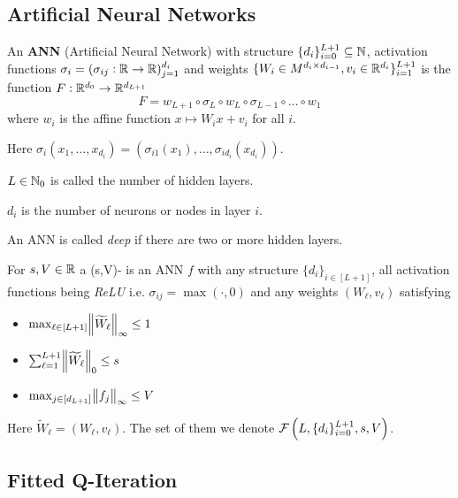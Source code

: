

\subsection{Artificial Neural Networks}

\begin{defn}\label{def_ANN}
	An \textbf{ANN} (Artificial Neural Network) with structure
	$\{ d_i \}_{i=0}^{L+1} \subseteq \mathbb{N}$,
	activation functions $\sigma_i = (\sigma_{ij} : \mathbb{R} \to \mathbb{R})_{j=1}^{d_i}$
	and weights $\{ W_i \in M^{d_i \times d_{i-1}}, v_i \in \mathbb{R}^{d_i} \}_{i=1}^{L+1}$
	is the function $F:\mathbb{R}^{d_0} \to \mathbb{R}^{d_{L+1}}$ 
	\[ F = w_{L+1} \circ \sigma_L \circ w_L \circ \sigma_{L-1} \circ \dots \circ w_1 \]
	where $w_i$ is the affine function $x \mapsto W_i x + v_i$ for all $i$.

	Here $\sigma_i(x_1, \dots, x_{d_i})
	= (\sigma_{i1}(x_1), \dots, \sigma_{id_{i}}(x_{d_{i}}))$.

	$L \in \mathbb{N}_0$ is called the number of hidden layers.

	$d_i$ is the number of neurons or nodes in layer $i$.
\end{defn}

An ANN is called \emph{deep} if there are two or more hidden layers.

\begin{defn}
  For $s,V \in \mathbb{R}$ a (s,V)- is an ANN $f$
  with any structure $\{d_i\}_{i\in [L+1]}$,
  all activation functions being \emph{ReLU} i.e. $\sigma_{ij} = \max(\cdot, 0)$
  and any weights $(W_\ell, v_\ell)$
  satisfying
  \begin{multicols}{3}
    \begin{itemize}
      \item $\max_{\ell \in [L+1]} \norm{\widetilde{W}_\ell}_\infty \leq 1$
      \item $\sum_{\ell = 1}^{L+1} \norm{\widetilde{W}_\ell}_0 \leq s$
      \item $\max_{j \in [d_{L+1}]} \norm{f_j}_\infty \leq V$
    \end{itemize}
  \end{multicols}
  Here $\widetilde{W}_\ell = (W_\ell, v_\ell)$.
  The set of them we denote $\mathcal{F}\left(L, \{d_i\}_{i=0}^{L+1},s,V \right)$.
  \label{def:sparseReLU}
\end{defn}

\subsection{Fitted Q-Iteration}

